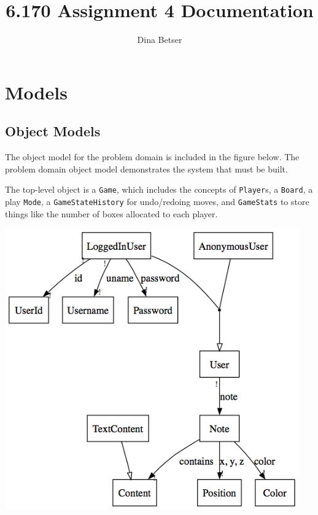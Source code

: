 \documentclass[11pt,letterpaper]{article}
\title{6.170 Assignment 4 Documentation}
\author{Dina Betser}
\begin{document}
\maketitle

\section{Models}
\subsection{Object Models}
The object model for the problem domain is included in the figure below. The problem domain object model demonstrates the system that must be built. 

The top-level object is a \texttt{Game}, which includes the concepts of \texttt{Player}s, a \texttt{Board}, a play \texttt{Mode}, a \texttt{GameStateHistory} for undo/redoing moves, and \texttt{GameStats} to store things like the number of boxes allocated to each player.
\begin{center}
\includegraphics[width=5in]{dot/obmod.png}
\label{fig:ob1} 
\end{center}
\end{document}
